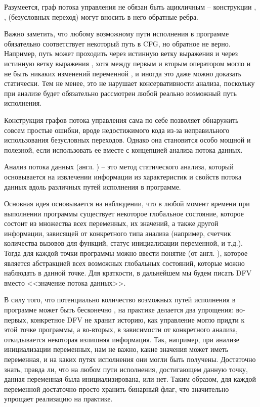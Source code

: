 Разумеется, граф потока управления не обязан быть ацикличным -- конструкции , ,  (безусловных переход) могут вносить в него обратные ребра.

Важно заметить, что любому возможному пути исполнения в программе обязательно соответствует некоторый путь в CFG, но обратное не верно. Например, путь может проходить через истинную ветку выражения \linebreak {} и через истинную ветку выражения , хотя между первым и вторым оператором могло и не быть никаких изменений переменной , и иногда это даже можно доказать статически.
Тем не менее, это не нарушает консервативности анализа, поскольку при анализе будет обязательно рассмотрен любой реально возможный путь исполнения. 

Конструкция графов потока управления сама по себе позволяет обнаружить совсем простые ошибки, вроде недостижимого кода из-за неправильного использования безусловных переходов. Однако она становится особо мощной и полезной, если использовать ее вместе с концепцией анализа потока данных.

\begin{definition}
	Анализ потока данных (англ. )  -- это метод статического анализа, который основывается на извлечении информации из характеристик и свойств потока данных вдоль различных путей исполнения в программе.
\end{definition}

Основная идея основывается на наблюдении, что в любой момент времени при выполнении программы существует некоторое глобальное состояние, которое состоит из множества всех переменных, их значений, а также другой информации, зависящей от конкретного типа анализа (например, счетчик количества вызовов для функций, статус инициализации переменной, и т.д.). Тогда для каждой точки программы можно ввести понятие  (от англ. ), которое является абстракцией всех возможных глобальных состояний, которые можно наблюдать в данной точке. Для краткости, в дальнейшем мы будем писать DFV вместо <<значение потока данных>>.

В силу того, что потенциально количество возможных путей исполнения в программе может быть бесконечно \cite{dragon-book}, на практике делается два упрощения: во-первых, конкретное DFV не хранит историю, как управление могло придти к этой точке программы, а во-вторых, в зависимости от конкретного анализа, откидывается некоторая излишняя информация. Так, например, при анализе инициализации переменных, нам не важно, какие значения может иметь переменная, и на каких путях исполнения они могли быть получены. Достаточно знать, правда ли, что на любом пути исполнения, достигающем данную точку, данная переменная была инициализирована, или нет. Таким образом, для каждой переменной достаточно просто хранить бинарный флаг, что значительно упрощает реализацию на практике.

